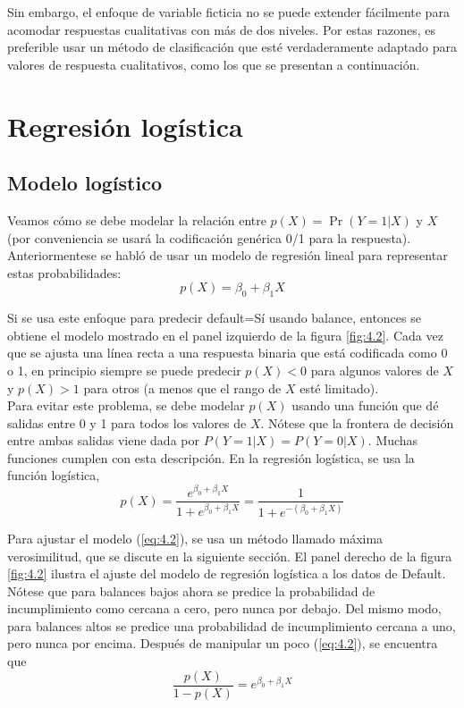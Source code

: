 Sin embargo, el enfoque de variable ficticia no se puede extender fácilmente para acomodar respuestas cualitativas con más de dos niveles. Por estas razones, es preferible usar un método de clasificación que esté verdaderamente adaptado para valores de respuesta cualitativos, como los que se presentan a continuación.

\section{Regresión logística}

\subsection{Modelo logístico}

Veamos cómo se debe modelar la relación entre $p(X) = \Pr(Y = 1|X)$ y $X$ (por conveniencia se usará la codificación genérica 0/1 para la respuesta). Anteriormentese se habló de usar un modelo de regresión lineal para representar estas probabilidades:
\begin{equation}
p(X) = \beta_0 + \beta_1 X
\label{eq:4.1}
\end{equation}

Si se usa este enfoque para predecir default=Sí usando balance, entonces se obtiene el modelo mostrado en el panel izquierdo de la figura \ref{fig:4.2}. Cada vez que se ajusta una línea recta a una respuesta binaria que está codificada como 0 o 1, en principio siempre se puede predecir $p(X) < 0$ para algunos valores de $X$ y $p(X) > 1$ para otros (a menos que el rango de $X$ esté limitado). \\

Para evitar este problema, se debe modelar $p(X)$ usando una función que dé salidas entre 0 y 1 para todos los valores de $X$. Nótese que la frontera de decisión entre ambas salidas viene dada por $P(Y = 1 |X) = P(Y = 0 | X)$. Muchas funciones cumplen con esta descripción. En la regresión logística, se usa la función logística,
\begin{equation}
p(X) = \frac{e^{\beta_0 + \beta_1 X}}{1 + e^{\beta_0 + \beta_1 X}} = \frac{1}{1 + e^{-(\beta_0 + \beta_1 X)}}
\label{eq:4.2}
\end{equation}

Para ajustar el modelo (\ref{eq:4.2}), se usa un método llamado máxima verosimilitud, que se discute en la siguiente sección. El panel derecho de la figura \ref{fig:4.2} ilustra el ajuste del modelo de regresión logística a los datos de Default. Nótese que para balances bajos ahora se predice la probabilidad de incumplimiento como cercana a cero, pero nunca por debajo. Del mismo modo, para balances altos se predice una probabilidad de incumplimiento cercana a uno, pero nunca por encima. Después de manipular un poco (\ref{eq:4.2}), se encuentra que
\begin{equation}
\frac{p(X)}{1 - p(X)} = e^{\beta_0 + \beta_1 X}
\label{eq:4.3}
\end{equation}

